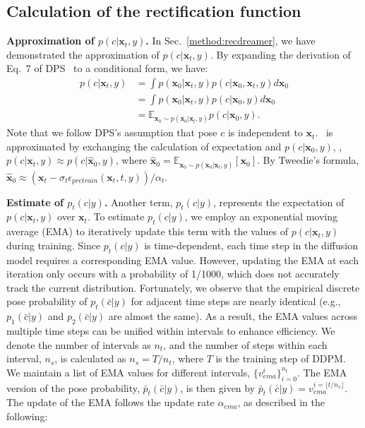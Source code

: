 \subsection{Calculation of the rectification function}\label{app:method_recfunc}
\textbf{Approximation of $p(c | \boldsymbol{x}_t, y)$.} In Sec.~\ref{method:recdreamer}, we have demonstrated the approximation of $p(c | \boldsymbol{x}_t, y)$. By expanding the derivation of Eq.~7 of DPS~\citep{chung2022diffusion} to a conditional form, we have:
\begin{equation}\label{eq:dps_pcxt}
    \begin{aligned}
 p(c | \boldsymbol{x}_t, y) &= \int p(\boldsymbol{x}_0|\boldsymbol{x}_t,y) p(c|\boldsymbol{x}_0,\boldsymbol{x}_t,y) d \boldsymbol{x}_0 \\
        &= \int p(\boldsymbol{x}_0|\boldsymbol{x}_t,y) p(c|\boldsymbol{x}_0,y) d \boldsymbol{x}_0 \\
        &= \mathbb{E}_{\boldsymbol{x}_0{\sim}p(\boldsymbol{x}_0|\boldsymbol{x}_t,y)}p(c|\boldsymbol{x}_0, y).
    \end{aligned}
\end{equation}
Note that we follow DPS's assumption that pose $c$ is independent to $\boldsymbol{x}_t$.~ is approximated by exchanging the calculation of expectation and $p(c|\boldsymbol{x}_0, y)$, \ie, $p(c | \boldsymbol{x}_t, y) \approx p(c|\hat{\boldsymbol{x}}_0, y)$, where $\hat{\boldsymbol{x}}_0 = \mathbb{E}_{\boldsymbol{x}_0{\sim}p(\boldsymbol{x}_0|\boldsymbol{x}_t,y)} [\boldsymbol{x}_0] $. By Tweedie's formula, $\hat{\boldsymbol{x}}_0 \approx \left(\boldsymbol{x}_t-\sigma_t\epsilon_{pretrain}(\boldsymbol{x}_t, t, y)\right)/\alpha_t$.

\textbf{Estimate of $p_t(c | y)$.} Another term, $p_t(c | y)$, represents the expectation of $p(c | \boldsymbol{x}_t, y)$ over $\boldsymbol{x}_t$. To estimate $p_t(c | y)$, we employ an exponential moving average (EMA) to iteratively update this term with the values of $p(c | \boldsymbol{x}_t, y)$ during training. Since $p_t(c | y)$ is time-dependent, each time step in the diffusion model requires a corresponding EMA value. However, updating the EMA at each iteration only occurs with a probability of 1/1000, which does not accurately track the current distribution. Fortunately, we observe that the empirical discrete pose probability of $p_t(\bar{c} | y)$ for adjacent time steps are nearly identical (e.g., $p_1(\bar{c} | y)$ and $p_2(\bar{c} | y)$ are almost the same). As a result, the EMA values across multiple time steps can be unified within intervals to enhance efficiency. We denote the number of intervals as $n_t$, and the number of steps within each interval, $n_s$, is calculated as $n_s = T / n_t$, where $T$ is the training step of DDPM. We maintain a list of EMA values for different intervals, $\{v_{ema}^i\}_{i=0}^{n_t}$. The EMA version of the pose probability, $\bar{p}_t(\bar{c}|y)$, is then given by $\bar{p}_t(\bar{c}|y) = v_{ema}^{i=\lfloor t/n_s \rfloor}$. The update of the EMA follows the update rate $\alpha_{ema}$, as described in the following:

